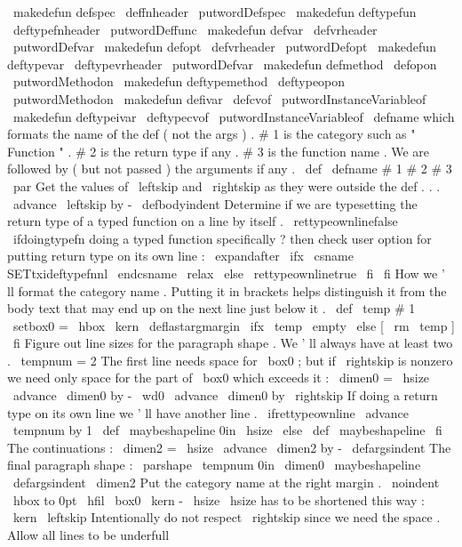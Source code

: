 {{{{{}
}
\
makedefun
{
defspec
}
{
\
deffnheader
{
\
putwordDefspec
}
}
\
makedefun
{
deftypefun
}
{
\
deftypefnheader
{
\
putwordDeffunc
}
}
\
makedefun
{
defvar
}
{
\
defvrheader
{
\
putwordDefvar
}
}
\
makedefun
{
defopt
}
{
\
defvrheader
{
\
putwordDefopt
}
}
\
makedefun
{
deftypevar
}
{
\
deftypevrheader
{
\
putwordDefvar
}
}
\
makedefun
{
defmethod
}
{
\
defopon
\
putwordMethodon
}
\
makedefun
{
deftypemethod
}
{
\
deftypeopon
\
putwordMethodon
}
\
makedefun
{
defivar
}
{
\
defcvof
\
putwordInstanceVariableof
}
\
makedefun
{
deftypeivar
}
{
\
deftypecvof
\
putwordInstanceVariableof
}
%
\
defname
which
formats
the
name
of
the
def
(
not
the
args
)
.
%
#
1
is
the
category
such
as
"
Function
"
.
%
#
2
is
the
return
type
if
any
.
%
#
3
is
the
function
name
.
%
%
We
are
followed
by
(
but
not
passed
)
the
arguments
if
any
.
%
\
def
\
defname
#
1
#
2
#
3
{
%
\
par
%
Get
the
values
of
\
leftskip
and
\
rightskip
as
they
were
outside
the
def
.
.
.
\
advance
\
leftskip
by
-
\
defbodyindent
%
%
Determine
if
we
are
typesetting
the
return
type
of
a
typed
function
%
on
a
line
by
itself
.
\
rettypeownlinefalse
\
ifdoingtypefn
%
doing
a
typed
function
specifically
?
%
then
check
user
option
for
putting
return
type
on
its
own
line
:
\
expandafter
\
ifx
\
csname
SETtxideftypefnnl
\
endcsname
\
relax
\
else
\
rettypeownlinetrue
\
fi
\
fi
%
%
How
we
'
ll
format
the
category
name
.
Putting
it
in
brackets
helps
%
distinguish
it
from
the
body
text
that
may
end
up
on
the
next
line
%
just
below
it
.
\
def
\
temp
{
#
1
}
%
\
setbox0
=
\
hbox
{
\
kern
\
deflastargmargin
\
ifx
\
temp
\
empty
\
else
[
\
rm
\
temp
]
\
fi
}
%
%
Figure
out
line
sizes
for
the
paragraph
shape
.
We
'
ll
always
have
at
%
least
two
.
\
tempnum
=
2
%
%
The
first
line
needs
space
for
\
box0
;
but
if
\
rightskip
is
nonzero
%
we
need
only
space
for
the
part
of
\
box0
which
exceeds
it
:
\
dimen0
=
\
hsize
\
advance
\
dimen0
by
-
\
wd0
\
advance
\
dimen0
by
\
rightskip
%
%
If
doing
a
return
type
on
its
own
line
we
'
ll
have
another
line
.
\
ifrettypeownline
\
advance
\
tempnum
by
1
\
def
\
maybeshapeline
{
0in
\
hsize
}
%
\
else
\
def
\
maybeshapeline
{
}
%
\
fi
%
%
The
continuations
:
\
dimen2
=
\
hsize
\
advance
\
dimen2
by
-
\
defargsindent
%
%
The
final
paragraph
shape
:
\
parshape
\
tempnum
0in
\
dimen0
\
maybeshapeline
\
defargsindent
\
dimen2
%
%
Put
the
category
name
at
the
right
margin
.
\
noindent
\
hbox
to
0pt
{
%
\
hfil
\
box0
\
kern
-
\
hsize
%
\
hsize
has
to
be
shortened
this
way
:
\
kern
\
leftskip
%
Intentionally
do
not
respect
\
rightskip
since
we
need
the
space
.
}
%
%
%
Allow
all
lines
to
be
underfull
}}}}

